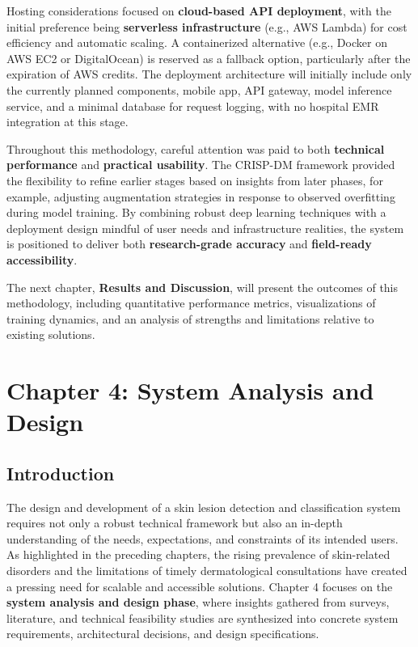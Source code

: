 \documentclass[
  12pt,
  oneside]{article}
\begin{document}
Hosting considerations focused on \textbf{cloud-based API deployment},
with the initial preference being \textbf{serverless infrastructure}
(e.g., AWS Lambda) for cost efficiency and automatic scaling. A
containerized alternative (e.g., Docker on AWS EC2 or DigitalOcean) is
reserved as a fallback option, particularly after the expiration of AWS
credits. The deployment architecture will initially include only the
currently planned components, mobile app, API gateway, model inference
service, and a minimal database for request logging, with no hospital
EMR integration at this stage.

Throughout this methodology, careful attention was paid to both
\textbf{technical performance} and \textbf{practical usability}. The
CRISP-DM framework provided the flexibility to refine earlier stages
based on insights from later phases, for example, adjusting augmentation
strategies in response to observed overfitting during model training. By
combining robust deep learning techniques with a deployment design
mindful of user needs and infrastructure realities, the system is
positioned to deliver both \textbf{research-grade accuracy} and
\textbf{field-ready accessibility}.

The next chapter, \textbf{Results and Discussion}, will present the
outcomes of this methodology, including quantitative performance
metrics, visualizations of training dynamics, and an analysis of
strengths and limitations relative to existing solutions.

\newpage

\section{Chapter 4: System Analysis and
Design}\label{chapter-4-system-analysis-and-design}

\subsection{Introduction}\label{introduction-3}

The design and development of a skin lesion detection and classification
system requires not only a robust technical framework but also an
in-depth understanding of the needs, expectations, and constraints of
its intended users. As highlighted in the preceding chapters, the rising
prevalence of skin-related disorders and the limitations of timely
dermatological consultations have created a pressing need for scalable
and accessible solutions. Chapter 4 focuses on the \textbf{system
analysis and design phase}, where insights gathered from surveys,
literature, and technical feasibility studies are synthesized into
concrete system requirements, architectural decisions, and design
specifications.
\end{document}
